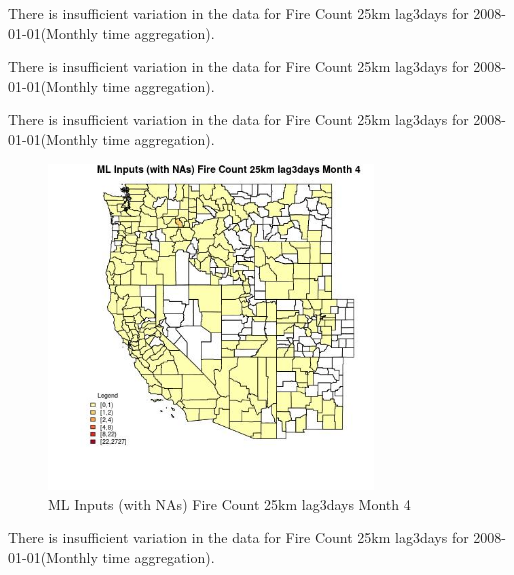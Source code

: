 There is insufficient variation in the data for Fire Count 25km lag3days for 2008-01-01(Monthly time aggregation). 
 

There is insufficient variation in the data for Fire Count 25km lag3days for 2008-01-01(Monthly time aggregation). 
 

There is insufficient variation in the data for Fire Count 25km lag3days for 2008-01-01(Monthly time aggregation). 
 

\begin{figure} 
\centering  
\includegraphics[width=0.77\textwidth]{Code_Outputs/Report_ML_input_PM25_Step4_part_f_de_duplicated_aves_prioritize_24hr_obswNAs_CountyFire_Count_25km_lag3daysmedianMonth4.jpg} 
\caption{\label{fig:Report_ML_input_PM25_Step4_part_f_de_duplicated_aves_prioritize_24hr_obswNAsCountyFire_Count_25km_lag3daysmedianMonth4}ML Inputs (with NAs) Fire Count 25km lag3days Month 4} 
\end{figure} 
 

There is insufficient variation in the data for Fire Count 25km lag3days for 2008-01-01(Monthly time aggregation). 
 

